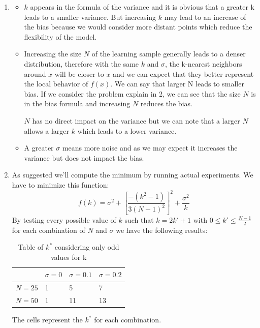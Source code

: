 \documentclass[a4paper,10pt]{article}
\begin{document}
\begin{enumerate}
    
    \item 
    \begin{itemize}
        \item 
        $k$ appears in the formula of the variance and it is obvious that a greater k leads to a smaller variance. But increasing $k$ may lead to an increase of the bias because we would consider more distant points which reduce the flexibility of the model.
        \item
        Increasing the size $N$ of the learning sample generally leads to a denser distribution, therefore with the same $k$ and $\sigma$, the k-nearest neighbors around $x$ will be closer to $x$ and we can expect that they better represent the local behavior of $f(x)$.
        We can say that larger N leads to smaller bias. If we consider the problem explain in 2, we can see that the size $N$ is in the bias formula and increasing $N$ reduces the bias.

        $N$ has no direct impact on the variance but we can note that a larger $N$ allows a larger $k$ which leads to a lower variance. 
        \item 
        A greater $\sigma$ means more noise and as we may expect it increases the variance but does not impact the bias.
    \end{itemize}


    
    \item
    As suggested we'll compute the minimum by running actual experiments. We have to minimize this function:
    $$
    f(k) = \sigma^2 + \left[\frac{-(k^2 - 1)}{3(N-1)^2}\right]^2 + \frac{\sigma^2}{k}
    $$
    By testing every possible value of $k$ such that $k = 2k' + 1$ with $0 \le k' \le \frac{N-1}{2}$ for each combination of $N$ and $\sigma$ we have the following results:
    \begin{table}[H]
      \centering
      \begin{tabular}{l|l|l|l|}
      \cline{2-4}
                               & $\sigma = 0$ & $\sigma = 0.1$ & $\sigma = 0.2$ \\ \hline
      \multicolumn{1}{|l|}{$N = 25$} & 1  &  5  &  7 \\ \hline
      \multicolumn{1}{|l|}{$N = 50$} & 1  &  11   &  13 \\ \hline
      \end{tabular}
      \caption{Table of $k^*$ considering only odd values for k}
    \end{table}
    The cells represent the $k^*$ for each combination.


\end{enumerate}
\end{document}
